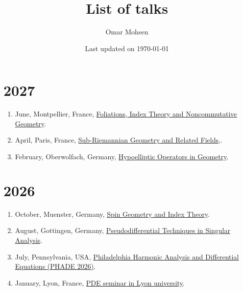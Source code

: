 \documentclass[a4paper, 13pt]{article}
\begin{document}
\title{List of talks}
\author{Omar Mohsen
}
\date{Last updated on \today}
\maketitle
\section*{2027}
\begin{enumerate}
\item June, Montpellier, France, \href{}{Foliations, Index Theory and Noncommutative Geometry}.
\item April, Paris, France, \href{}{Sub-Riemannian Geometry and Related Fields,}.
\item February, Oberwolfach, Germany, \href{}{Hypoelliptic Operators in Geometry}.
\end{enumerate}
\section*{2026}
\begin{enumerate}
  \item October, Muenster, Germany, \href{}{Spin Geometry and Index Theory}.
  \item  August, Gottingen, Germany, \href{}{Pseudodifferential Techniques in Singular Analysis}.
  \item July, Pennsylvania, USA, \href{}{Philadelphia Harmonic Analysis and Differential Equations (PHADE 2026)}.
    \item     January, Lyon, France, \href{}{PDE seminar in Lyon university}.
\end{enumerate}
\end{document}
